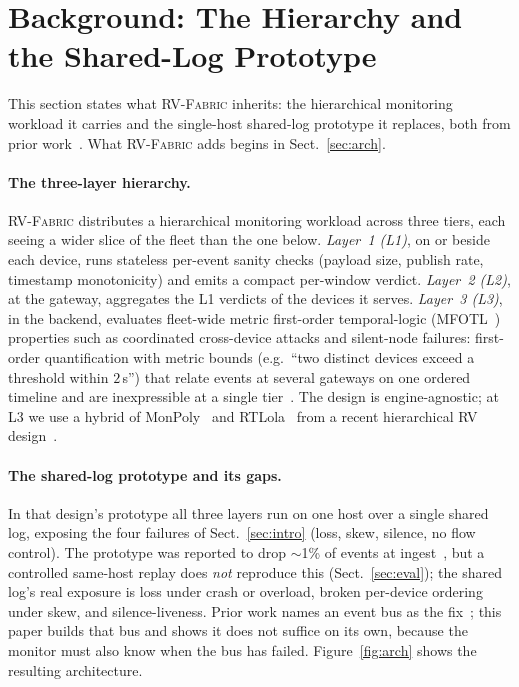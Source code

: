 \documentclass[runningheads]{llncs}
\newcommand{\sys}{\textsc{RV-Fabric}\xspace}
\begin{document}
\section{Background: The Hierarchy and the Shared-Log Prototype}
\label{sec:background}
This section states what \sys inherits: the hierarchical monitoring workload it carries
and the single-host shared-log prototype it replaces, both from prior
work~\cite{ares2026,csr2026}. What \sys adds begins in Sect.~\ref{sec:arch}.

\paragraph{The three-layer hierarchy.}
\sys distributes a hierarchical monitoring workload across three tiers, each seeing a
wider slice of the fleet than the one below. \emph{Layer~1 (L1)}, on or beside each
device, runs stateless per-event sanity checks (payload size, publish rate, timestamp
monotonicity) and emits a compact per-window verdict. \emph{Layer~2 (L2)}, at the
gateway, aggregates the L1 verdicts of the devices it serves. \emph{Layer~3 (L3)}, in
the backend, evaluates fleet-wide metric first-order temporal-logic
(MFOTL~\cite{basin2015mfotl}) properties such as coordinated cross-device attacks and
silent-node failures: first-order quantification with metric bounds (e.g.\ ``two distinct
devices exceed a threshold within $2$\,s'') that relate events at several gateways on one
ordered timeline and are inexpressible at a single tier~\cite{ares2026,csr2026}. The
design is engine-agnostic; at L3 we use a hybrid of MonPoly~\cite{monpoly} and
RTLola~\cite{rtlola} from a recent hierarchical RV design~\cite{ares2026}.

\paragraph{The shared-log prototype and its gaps.}
In that design's prototype all three layers run on one host over a single shared log,
exposing the four failures of Sect.~\ref{sec:intro} (loss, skew, silence, no flow
control). The prototype was reported to drop $\sim$1\% of events at ingest~\cite{ares2026},
but a controlled same-host replay does \emph{not} reproduce this (Sect.~\ref{sec:eval});
the shared log's real exposure is loss under crash or overload, broken per-device ordering
under skew, and silence-liveness. Prior work names an event bus as the
fix~\cite{ares2026,csr2026}; this paper builds that bus and shows it does not suffice on
its own, because the monitor must also know when the bus has failed. Figure~\ref{fig:arch} shows the resulting architecture.
\end{document}
